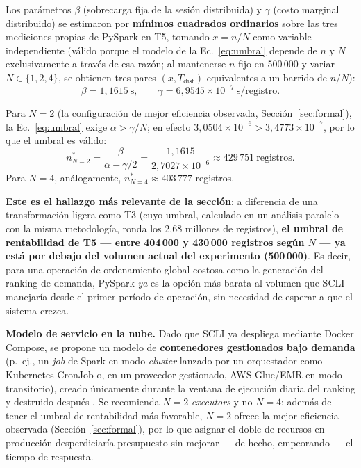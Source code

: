 \documentclass[10pt,conference]{IEEEtran}
\begin{document}
Los parámetros $\beta$ (sobrecarga fija de la sesión distribuida) y $\gamma$ (costo marginal distribuido) se estimaron por \textbf{mínimos cuadrados ordinarios} sobre las tres mediciones propias de PySpark en T5, tomando $x=n/N$ como variable independiente (válido porque el modelo de la Ec.~\eqref{eq:umbral} depende de $n$ y $N$ exclusivamente a través de esa razón; al mantenerse $n$ fijo en 500\,000 y variar $N\in\{1,2,4\}$, se obtienen tres pares $(x,T_{\text{dist}})$ equivalentes a un barrido de $n/N$):
\[
\beta = 1{,}1615\ \text{s}, \qquad \gamma = 6{,}9545\times10^{-7}\ \text{s/registro}.
\]

Para $N=2$ (la configuración de mejor eficiencia observada, Sección~\ref{sec:formal}), la Ec.~\eqref{eq:umbral} exige $\alpha > \gamma/N$; en efecto $3{,}0504\times10^{-6} > 3{,}4773\times10^{-7}$, por lo que el umbral es válido:
\[
n^{*}_{N=2} = \frac{\beta}{\alpha - \gamma/2} = \frac{1{,}1615}{2{,}7027\times10^{-6}} \approx 429\,751\ \text{registros}.
\]
Para $N=4$, análogamente, $n^{*}_{N=4} \approx 403\,777$ registros.

\textbf{Este es el hallazgo más relevante de la sección}: a diferencia de una transformación ligera como T3 (cuyo umbral, calculado en un análisis paralelo con la misma metodología, ronda los 2,68 millones de registros), \textbf{el umbral de rentabilidad de T5 --- entre 404\,000 y 430\,000 registros según $N$ --- ya está por debajo del volumen actual del experimento (500\,000)}. Es decir, para una operación de ordenamiento global costosa como la generación del ranking de demanda, PySpark \emph{ya} es la opción más barata al volumen que SCLI manejaría desde el primer período de operación, sin necesidad de esperar a que el sistema crezca.

\textbf{Modelo de servicio en la nube.} Dado que SCLI ya despliega mediante Docker Compose, se propone un modelo de \textbf{contenedores gestionados bajo demanda} (p.\ ej., un \textit{job} de Spark en modo \textit{cluster} lanzado por un orquestador como Kubernetes CronJob o, en un proveedor gestionado, AWS Glue/EMR en modo transitorio), creado únicamente durante la ventana de ejecución diaria del ranking y destruido después \cite{dean2015bigdata}. Se recomienda $N=2$ \textit{executors} y no $N=4$: además de tener el umbral de rentabilidad más favorable, $N=2$ ofrece la mejor eficiencia observada (Sección~\ref{sec:formal}), por lo que asignar el doble de recursos en producción desperdiciaría presupuesto sin mejorar --- de hecho, empeorando --- el tiempo de respuesta.
\end{document}
